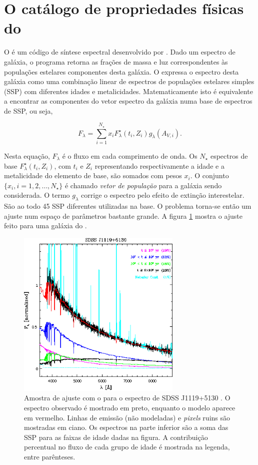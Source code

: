 \section{O catálogo de propriedades físicas do \STARLIGHT}
\label{sec:Intro:Starlight}

O \starlight é um código de síntese espectral desenvolvido por
\citet{CidFernandes2005}. Dado um espectro de galáxia, o programa retorna as
frações de massa e luz correspondentes às populações estelares componentes desta
galáxia. O \starlight expressa o espectro desta galáxia como uma combinação
linear de espectros de populações estelares simples (SSP) com diferentes idades
e metalicidades. Matematicamente isto é equivalente a encontrar as componentes
do vetor espectro da galáxia numa base de espectros de SSP, ou seja,

$$ F_\lambda = \sum_{i=1}^{N_\star} x_i F^\star_\lambda(t_i,Z_i)
g_\lambda(A_{V,i}). $$

Nesta equação, $F_\lambda$ é o fluxo em cada comprimento de onda. Os $N_\star$
espectros de base $F^\star_\lambda(t_i, Z_i)$, com $t_i$ e $Z_i$ representando
respectivamente a idade e a metalicidade do elemento de base, são somados com
pesos $x_i$. O conjunto $\{x_i, i=1,2,\ldots,N_\star\}$ é chamado {\em vetor de
população} para a galáxia sendo considerada. O termo $g_\lambda$ corrige o
espectro pelo efeito de extinção interestelar. São ao todo 45 SSP diferentes
utilizadas na base. O problema torna-se então um ajuste num espaço de parâmetros
bastante grande. A figura \ref{fig:StarlightSpectrumSample} mostra o ajuste
feito para uma galáxia do \SDSS.

\begin{figure}
	\includegraphics[width=0.7\textwidth]{figuras/starlight-fit.eps}
	\caption[Amostra de ajuste de espectro com o \starlight.]
	{Amostra de ajuste com o \starlight para o espectro de SDSS
	J1119+5130 \citep[figura 2]{CidFernandes2006}. O espectro observado é mostrado
	em preto, enquanto o modelo aparece em vermelho. Linhas de emissão (não
	modeladas) e {\em pixels} ruins são mostradas em ciano. Os espectros na parte
	inferior são a soma das SSP para as faixas de idade dadas na figura. A
	contribuição percentual no fluxo de cada grupo de idade é mostrada na legenda,
	entre parênteses.}
	\label{fig:StarlightSpectrumSample}
\end{figure}

